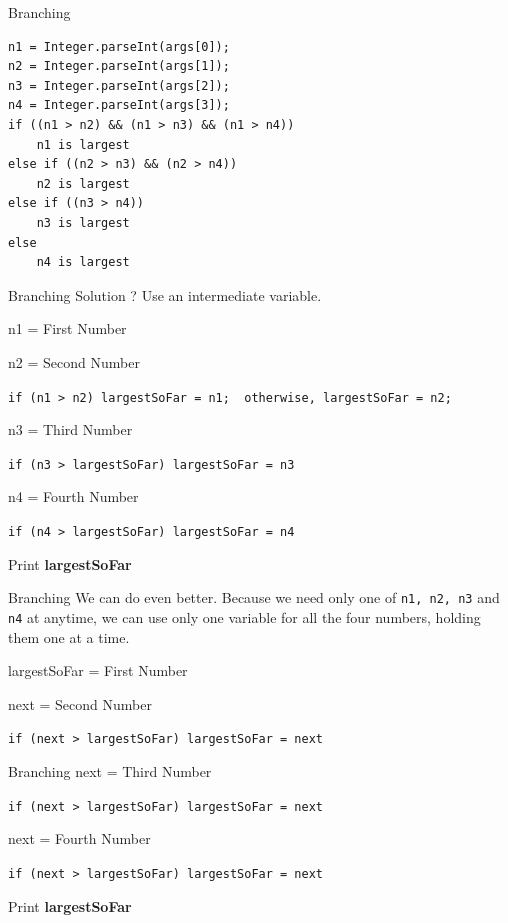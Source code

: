 \documentclass[12pt]{beamer}
\begin{document}
\begin{frame}[fragile]{Branching}
 \begin{lstlisting}[numbers=none]
n1 = Integer.parseInt(args[0]);
n2 = Integer.parseInt(args[1]);
n3 = Integer.parseInt(args[2]);
n4 = Integer.parseInt(args[3]);
if ((n1 > n2) && (n1 > n3) && (n1 > n4))
    n1 is largest
else if ((n2 > n3) && (n2 > n4))
    n2 is largest
else if ((n3 > n4))
    n3 is largest
else
    n4 is largest
 \end{lstlisting}

\end{frame}

\begin{frame}[fragile]{Branching}
 Solution ? Use an intermediate variable.
 
 \vspace{1pc}
 n1 = First Number
 
 n2 = Second Number
 
 \lstinline!if (n1 > n2) largestSoFar = n1;  otherwise, largestSoFar = n2;!
 
 n3 = Third Number
 
 \lstinline!if (n3 > largestSoFar) largestSoFar = n3!
 
 n4 = Fourth Number
 
 \lstinline!if (n4 > largestSoFar) largestSoFar = n4!
 
 Print \textbf{largestSoFar}
  
\end{frame}

\begin{frame}[fragile]{Branching}
  We can do even better. Because we need only one of \texttt{n1, n2, n3} and \texttt{n4} at anytime, we can use only one variable for all the four numbers, holding them one at a time. 
  
  \vspace{1cm}
  largestSoFar = First Number
  
  next = Second Number
  
  \lstinline!if (next > largestSoFar) largestSoFar = next!
\end{frame}

\begin{frame}[fragile]{Branching}
 next = Third Number
 
 \lstinline!if (next > largestSoFar) largestSoFar = next!
 
 next = Fourth Number
 
 \lstinline!if (next > largestSoFar) largestSoFar = next!
 
 Print \textbf{largestSoFar}
\end{frame}
\end{document}
